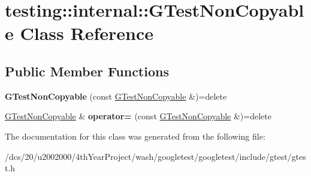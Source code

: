 \hypertarget{classtesting_1_1internal_1_1GTestNonCopyable}{}\section{testing\+:\+:internal\+:\+:G\+Test\+Non\+Copyable Class Reference}
\label{classtesting_1_1internal_1_1GTestNonCopyable}
\subsection*{Public Member Functions}
\begin{DoxyCompactItemize}
\item 
\mbox{\label{classtesting_1_1internal_1_1GTestNonCopyable_a8da869d54dd10353ccbb8a1df2183a20}} 
{\bfseries G\+Test\+Non\+Copyable} (const \mbox{\hyperlink{classtesting_1_1internal_1_1GTestNonCopyable}{G\+Test\+Non\+Copyable}} \&)=delete
\item 
\mbox{\label{classtesting_1_1internal_1_1GTestNonCopyable_a6f3586297e3ce6be6972c18cff2f7e6e}} 
\mbox{\hyperlink{classtesting_1_1internal_1_1GTestNonCopyable}{G\+Test\+Non\+Copyable}} \& {\bfseries operator=} (const \mbox{\hyperlink{classtesting_1_1internal_1_1GTestNonCopyable}{G\+Test\+Non\+Copyable}} \&)=delete
\end{DoxyCompactItemize}


The documentation for this class was generated from the following file\+:\begin{DoxyCompactItemize}
\item 
/dcs/20/u2002000/4th\+Year\+Project/wash/googletest/googletest/include/gtest/gtest.\+h\end{DoxyCompactItemize}
